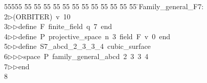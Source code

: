 %
%
\begin{tabbing}
55555 \= 55 \= 55 \= 55 \= 55 \= 55 \= 55 \= 55 \= 55 \= 55 \= 55 \= 55 \= 55 \= \>Family\_general\_F7:\\[0pt]
2\>$\triangleright$\>(ORBITER)\ v\ 10\ \\[0pt]
3\>$\triangleright$\>$\triangleright$\>define\ F\ finite\_field\ q\ 7\ end\ \\[0pt]
4\>$\triangleright$\>$\triangleright$\>define\ P\ projective\_space\ n\ 3\ field\ F\ v\ 0\ end\ \\[0pt]
5\>$\triangleright$\>$\triangleright$\>define\ S7\_abcd\_2\_3\_3\_4\ cubic\_surface\ \\[0pt]
6\>$\triangleright$\>$\triangleright$\>$\triangleright$\>space\ P\ family\_general\_abcd\ 2\ 3\ 3\ 4\ \\[0pt]
7\>$\triangleright$\>$\triangleright$\>end\\[0pt]
8\>\end{tabbing}
